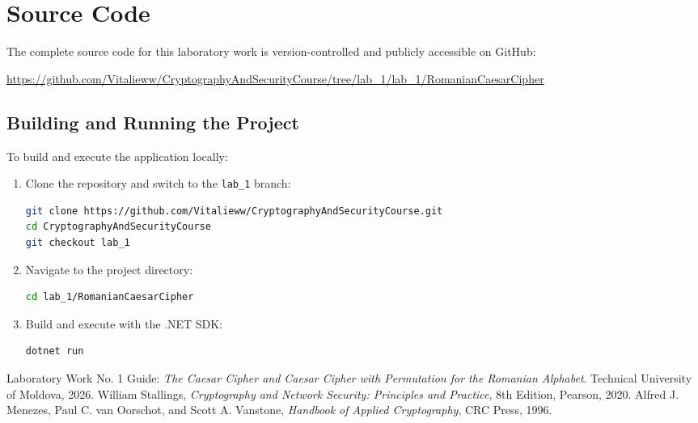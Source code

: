 \documentclass[12pt,a4paper]{article}
\begin{document}
\section{Source Code}

The complete source code for this laboratory work is version-controlled and publicly accessible on GitHub:

\begin{center}
\large
\url{https://github.com/Vitalieww/CryptographyAndSecurityCourse/tree/lab_1/lab_1/RomanianCaesarCipher}
\end{center}

\subsection{Building and Running the Project}
To build and execute the application locally:
\begin{enumerate}
    \item Clone the repository and switch to the \texttt{lab\_1} branch:
\begin{lstlisting}[language=bash,numbers=none,basicstyle=\footnotesize\ttfamily]
git clone https://github.com/Vitalieww/CryptographyAndSecurityCourse.git
cd CryptographyAndSecurityCourse
git checkout lab_1
\end{lstlisting}
    \item Navigate to the project directory:
\begin{lstlisting}[language=bash,numbers=none,basicstyle=\footnotesize\ttfamily]
cd lab_1/RomanianCaesarCipher
\end{lstlisting}
    \item Build and execute with the .NET SDK:
\begin{lstlisting}[language=bash,numbers=none,basicstyle=\footnotesize\ttfamily]
dotnet run
\end{lstlisting}
\end{enumerate}

\begin{thebibliography}{9}
Laboratory Work No. 1 Guide: \emph{The Caesar Cipher and Caesar Cipher with Permutation for the Romanian Alphabet}. Technical University of Moldova, 2026.
William Stallings, \emph{Cryptography and Network Security: Principles and Practice}, 8th Edition, Pearson, 2020.
Alfred J. Menezes, Paul C. van Oorschot, and Scott A. Vanstone, \emph{Handbook of Applied Cryptography}, CRC Press, 1996.
\end{thebibliography}
\end{document}
